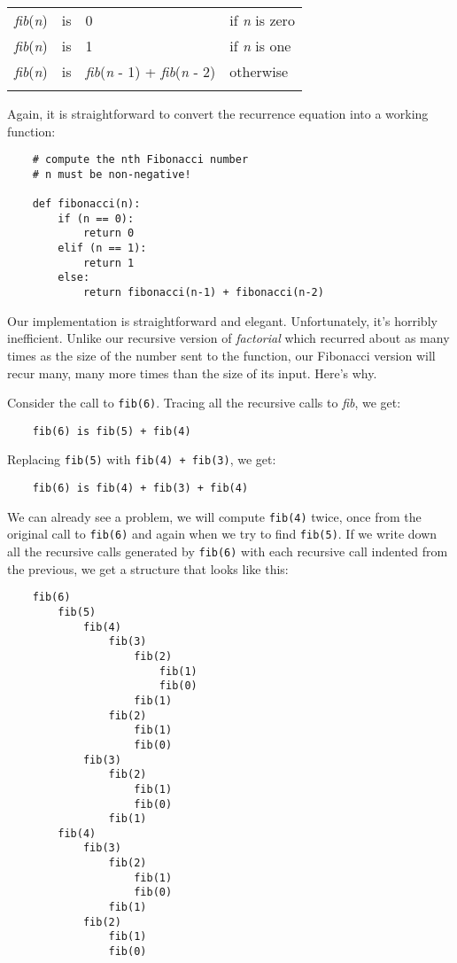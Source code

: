 \begin{center}
\begin{tabular}{lcll}
\T\toprule
    {\it fib}({\it n}) & is & 0 & if {\it n} is zero\\
    {\it fib}({\it n}) & is & 1 & if {\it n} is one\\
    {\it fib}({\it n}) & is & {\it fib}({\it n} - 1) + {\it fib}({\it n} - 2) & otherwise\\
\T\bottomrule
\end{tabular}
\end{center}

Again, it is straightforward to convert the recurrence equation
into a working function:
 
\begin{verbatim}
    # compute the nth Fibonacci number
    # n must be non-negative!
    
    def fibonacci(n):
        if (n == 0):
            return 0
        elif (n == 1):
            return 1
        else:
            return fibonacci(n-1) + fibonacci(n-2)
\end{verbatim}

Our implementation is straightforward and elegant. Unfortunately, it's
horribly inefficient. Unlike our recursive version of
{\it factorial} which
recurred about as many times as the size of the number sent to the function,
our Fibonacci version will recur many, many more times than the size of
its input.  Here's why.

Consider the call to \verb!fib(6)!.
Tracing all the recursive calls to {\it fib}, we get:

\begin{verbatim}
    fib(6) is fib(5) + fib(4)
\end{verbatim}

Replacing \verb!fib(5)! with \verb!fib(4) + fib(3)!,
we get:

\begin{verbatim}
    fib(6) is fib(4) + fib(3) + fib(4)
\end{verbatim}

We can already see a problem, we will compute \verb!fib(4)! twice,
once from the original call to \verb!fib(6)! and again when we
try to find \verb!fib(5)!.
If we write down all the recursive calls generated by \verb!fib(6)!
with each recursive call indented from the previous, we
get a structure that looks like this:

\begin{verbatim}
    fib(6)
        fib(5)
            fib(4)
                fib(3)
                    fib(2)
                        fib(1)
                        fib(0)
                    fib(1)
                fib(2)
                    fib(1)
                    fib(0)
            fib(3)
                fib(2)
                    fib(1)
                    fib(0)
                fib(1)
        fib(4)
            fib(3)
                fib(2)
                    fib(1)
                    fib(0)
                fib(1)
            fib(2)
                fib(1)
                fib(0)
\end{verbatim}


